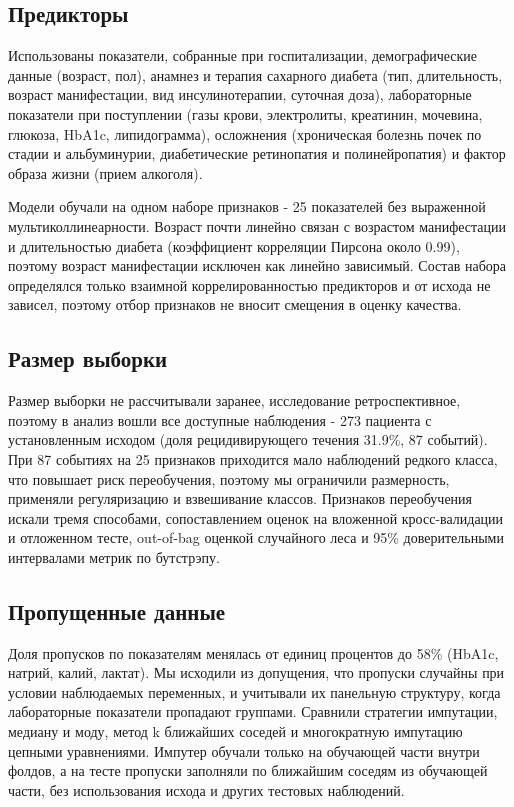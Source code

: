 \documentclass[pdflatex,sn-basic,Numbered]{sn-jnl}
\begin{document}
\subsection{Предикторы}\label{subsec2_4}

Использованы показатели, собранные при госпитализации, демографические данные (возраст, пол), анамнез и терапия сахарного диабета (тип, длительность, возраст манифестации, вид инсулинотерапии, суточная доза), лабораторные показатели при поступлении (газы крови, электролиты, креатинин, мочевина, глюкоза, HbA1c, липидограмма), осложнения (хроническая болезнь почек по стадии и альбуминурии, диабетические ретинопатия и полинейропатия) и фактор образа жизни (прием алкоголя).

Модели обучали на одном наборе признаков - 25 показателей без выраженной мультиколлинеарности. Возраст почти линейно связан с возрастом манифестации и длительностью диабета (коэффициент корреляции Пирсона около 0.99), поэтому возраст манифестации исключен как линейно зависимый. Состав набора определялся только взаимной коррелированностью предикторов и от исхода не зависел, поэтому отбор признаков не вносит смещения в оценку качества.

\subsection{Размер выборки}\label{subsec2_5}

Размер выборки не рассчитывали заранее, исследование ретроспективное, поэтому в анализ вошли все доступные наблюдения - 273 пациента с установленным исходом (доля рецидивирующего течения 31.9\%, 87 событий). При 87 событиях на 25 признаков приходится мало наблюдений редкого класса, что повышает риск переобучения, поэтому мы ограничили размерность, применяли регуляризацию и взвешивание классов. Признаков переобучения искали тремя способами, сопоставлением оценок на вложенной кросс-валидации и отложенном тесте, out-of-bag оценкой случайного леса и 95\% доверительными интервалами метрик по бутстрэпу.

\subsection{Пропущенные данные}\label{subsec2_6}

Доля пропусков по показателям менялась от единиц процентов до 58\% (HbA1c, натрий, калий, лактат). Мы исходили из допущения, что пропуски случайны при условии наблюдаемых переменных, и учитывали их панельную структуру, когда лабораторные показатели пропадают группами. Сравнили стратегии импутации, медиану и моду, метод k ближайших соседей и многократную импутацию цепными уравнениями. Импутер обучали только на обучающей части внутри фолдов, а на тесте пропуски заполняли по ближайшим соседям из обучающей части, без использования исхода и других тестовых наблюдений.
\end{document}
